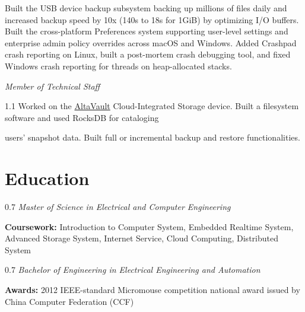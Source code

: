 \documentclass{yijiem}
\begin{document}
\begin{description}
{        {Built the USB device backup subsystem backing up millions of files daily and increased backup speed by 10x (140s to 18s for 1GiB) by optimizing I/O buffers.}
        {Built the cross-platform Preferences system supporting user-level settings and enterprise admin policy overrides across macOS and Windows.}
        {Added Crashpad crash reporting on Linux, built a post-mortem crash debugging tool, and fixed Windows crash reporting for threads on heap-allocated stacks.}}
    \end{description}
    \textit{\small Member of Technical Staff}
    \begin{spacing}{1.1}
    Worked on the \href{https://www.netapp.com/media/19930-ds-3651.pdf}{AltaVault} Cloud-Integrated Storage device. Built a filesystem software and used RocksDB for cataloging
    \end{spacing}
    users' snapshot data. Built full or incremental backup and restore functionalities.

\section{Education}
    \begin{spacing}{0.7}
    \textit{\small Master of Science in Electrical and Computer Engineering}\newline
    \end{spacing}
    \textbf{Coursework:} Introduction to Computer System, Embedded Realtime System, Advanced Storage System, Internet Service, Cloud Computing, Distributed System
    \begin{spacing}{0.7}
    \textit{\small Bachelor of Engineering in Electrical Engineering and Automation}\newline
    \end{spacing}
    \textbf{Awards:} 2012 IEEE-standard Micromouse competition national award issued by China Computer Federation (CCF)
\end{document}
